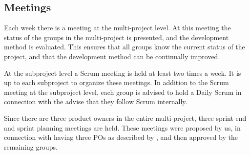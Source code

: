 
\subsection{Meetings}\label{sec:scrum_meetings}
Each week there is a meeting at the multi-project level. At this meeting the status of the groups in the multi-project is presented, and the development method is evaluated. This ensures that all groups know the current status of the project, and that the development method can be continually improved.

At the subproject level a Scrum meeting is held at least two times a week. It is up to each subproject to organize these meetings. In addition to the Scrum meeting at the subproject level, each group is advised to hold a Daily Scrum in connection with the advise that they follow Scrum internally.

Since there are three product owners in the entire multi-project, three sprint end and sprint planning meetings are held. These meetings were proposed by us, in connection with having three POs as described by \textcite{bird_davies_2007}, and then approved by the remaining groups.


